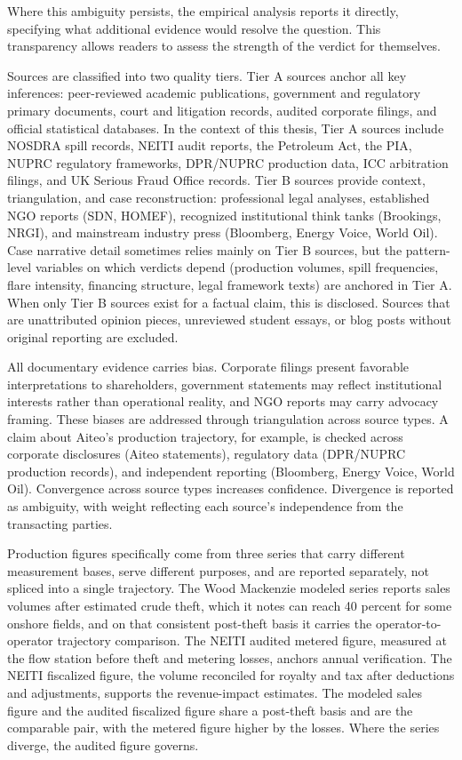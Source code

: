 \documentclass[twoside,fontset=lmodern]{mitthesis}
\begin{document}
Where this ambiguity persists, the empirical analysis reports it
directly, specifying what additional evidence would resolve the
question. This transparency allows readers to assess the strength of the
verdict for themselves.

Sources are classified into two quality tiers. Tier A sources anchor all
key inferences: peer-reviewed academic publications, government and
regulatory primary documents, court and litigation records, audited
corporate filings, and official statistical databases. In the context of
this thesis, Tier A sources include NOSDRA spill records, NEITI audit
reports, the Petroleum Act, the PIA, NUPRC regulatory frameworks,
DPR/NUPRC production data, ICC arbitration filings, and UK Serious Fraud
Office records. Tier B sources provide context, triangulation, and case
reconstruction: professional legal analyses, established NGO reports
(SDN, HOMEF), recognized institutional think tanks (Brookings, NRGI),
and mainstream industry press (Bloomberg, Energy Voice, World Oil). Case
narrative detail sometimes relies mainly on Tier B sources, but the
pattern-level variables on which verdicts depend (production volumes,
spill frequencies, flare intensity, financing structure, legal framework
texts) are anchored in Tier A. When only Tier B sources exist for a
factual claim, this is disclosed. Sources that are unattributed opinion
pieces, unreviewed student essays, or blog posts without original
reporting are excluded.

All documentary evidence carries bias. Corporate filings present
favorable interpretations to shareholders, government statements may
reflect institutional interests rather than operational reality, and NGO
reports may carry advocacy framing. These biases are addressed through
triangulation across source types. A claim about Aiteo's production
trajectory, for example, is checked across corporate disclosures (Aiteo
statements), regulatory data (DPR/NUPRC production records), and
independent reporting (Bloomberg, Energy Voice, World Oil). Convergence
across source types increases confidence. Divergence is reported as
ambiguity, with weight reflecting each source's independence from the
transacting parties.

Production figures specifically come from three series that carry
different measurement bases, serve different purposes, and are reported
separately, not spliced into a single trajectory. The Wood Mackenzie
modeled series reports sales volumes after estimated crude theft, which
it notes can reach 40 percent for some onshore fields, and on that
consistent post-theft basis it carries the operator-to-operator
trajectory comparison. The NEITI audited metered figure, measured at the
flow station before theft and metering losses, anchors annual
verification. The NEITI fiscalized figure, the volume reconciled for
royalty and tax after deductions and adjustments, supports the
revenue-impact estimates. The modeled sales figure and the audited
fiscalized figure share a post-theft basis and are the comparable pair,
with the metered figure higher by the losses. Where the series diverge,
the audited figure governs.
\end{document}
